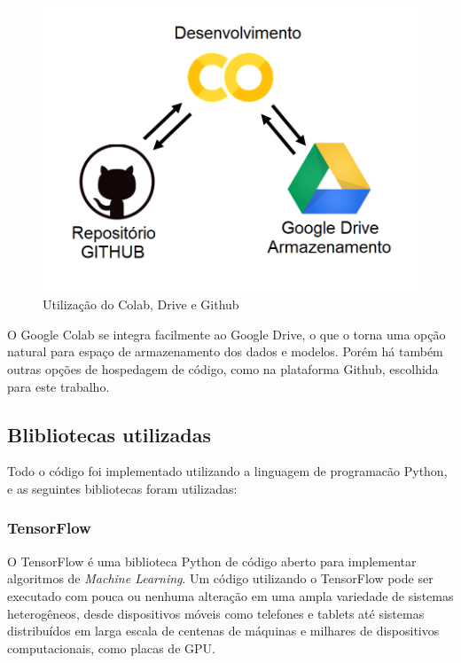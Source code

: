 \begin{figure}[H]
		\centering
		\includegraphics[scale=0.4]{figuras/MachineLearning/colabGithub.png}
		\caption{Utilização do Colab, Drive e Github}
		\label{fig:colabGithub}
\end{figure}

O Google Colab se integra facilmente ao Google Drive, o que o torna uma opção natural para espaço de armazenamento dos dados e modelos. Porém há também outras opções de hospedagem de código, como na plataforma Github, escolhida para este trabalho.

\subsection{Blibliotecas utilizadas}

Todo o código foi implementado utilizando a linguagem de programacão Python, e as seguintes bibliotecas foram utilizadas:


\subsubsection{TensorFlow}

O TensorFlow é uma biblioteca Python de código aberto para implementar algoritmos de \textit{Machine Learning}. Um código utilizando o TensorFlow pode ser executado com pouca ou nenhuma alteração em uma ampla variedade de sistemas heterogêneos, desde dispositivos móveis como telefones e tablets até sistemas distribuídos em larga escala de centenas de máquinas e milhares de dispositivos computacionais, como placas de GPU.

